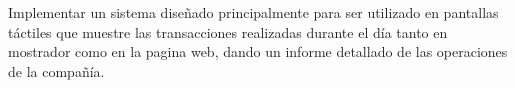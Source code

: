Implementar un sistema diseñado principalmente para ser utilizado en pantallas táctiles que muestre las transacciones realizadas durante el día tanto en mostrador como en la pagina web, dando un informe detallado de las operaciones de la compañía.